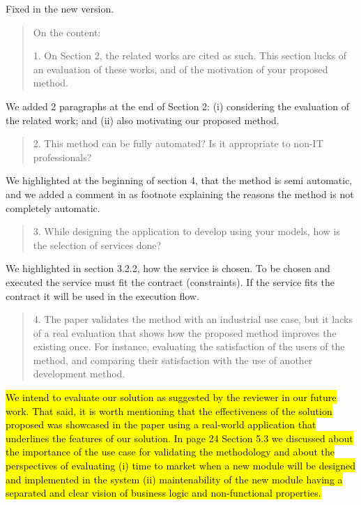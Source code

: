 \documentclass[12pt,a4wide]{article}
\begin{document}
\noindent 
Fixed in the new version.


\begin{quotation}\sf\footnotesize

\noindent On the content: 

1.	On Section 2, the related works are cited as such. This section lucks of an evaluation of these works, and of the motivation of your proposed method. 
\end{quotation}

\noindent 
We added 2 paragraphs at the end of Section 2: (i) considering the evaluation of the related work; and (ii) also motivating our proposed method. 
\begin{quotation}\sf\footnotesize

2.	This method can be fully automated? Is it appropriate to non-IT professionals? 
\end{quotation}

\noindent 
We highlighted at the beginning of section 4, that the method is semi automatic, and we added a comment in as footnote explaining the reasons the method is not completely automatic.

\begin{quotation}\sf\footnotesize

3.	While designing the application to develop using your models, how is the selection of services done? 
\end{quotation}

\noindent 
We highlighted in section 3.2.2, how the service is chosen.  To be chosen and executed the service must fit the contract (constraints). If the service fits the contract it will be used in the execution flow.

\begin{quotation}\sf\footnotesize

4.	The paper validates the method with an industrial use case, but it lacks of a real evaluation that shows how the proposed method improves the existing once. For instance, evaluating the satisfaction of the users of the method, and comparing their satisfaction with the use of another development method. 
\end{quotation}

\noindent 
\hl{We intend to evaluate our solution as suggested by the reviewer in our future work. That said, it is worth mentioning that the effectiveness of the solution proposed was showcased in the paper using a real-world application that underlines the features of our solution. In page 24 Section 5.3 we discussed about the importance of the use case for validating the methodology and about the perspectives of evaluating (i) time to market when a new module will be designed and implemented in the system (ii) maintenability of the new module having a separated and clear vision of business logic and non-functional properties.}
\end{document}
